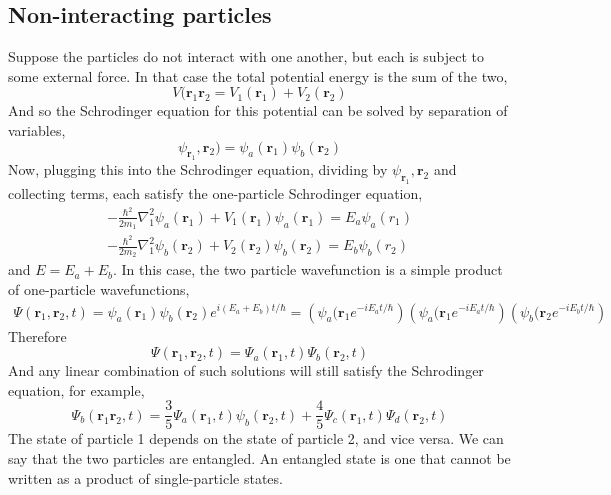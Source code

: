 \subsection{Non-interacting particles}
Suppose the particles do not interact with one another, but each is subject to some external force. In that case the total potential energy is the sum of the two,
\begin{equation}
    V(\textbf{r}_1\textbf{r}_2=V_1(\textbf{r}_1)+V_2(\textbf{r}_2)
\end{equation}
And so the Schrodinger equation for this potential can be solved by separation of variables,
\begin{equation}
    \psi_\textbf{r}_1,\textbf{r}_2)=\psi_a(\textbf{r}_1)\psi_b(\textbf{r}_2)
\end{equation}
Now, plugging this into the Schrodinger equation, dividing by $\psi_\textbf{r}_1,\textbf{r}_2$ and collecting terms, each satisfy the one-particle Schrodinger equation,
\begin{gather}
    -\frac{\hbar^2}{2m_1}\nabla^2_1\psi_a(\textbf{r}_1)+V_1(\textbf{r}_1)\psi_a(\textbf{r}_1)=E_a\psi_a(r_1)\\
     -\frac{\hbar^2}{2m_2}\nabla^2_1\psi_b(\textbf{r}_2)+V_2(\textbf{r}_2)\psi_b(\textbf{r}_2)=E_b\psi_b(r_2)
\end{gather}
and $E=E_a+E_b$. In this case, the two particle wavefunction is a simple product of one-particle wavefunctions,
\begin{gather}
    \Psi(\textbf{r}_1,\textbf{r}_2,t)=\psi_a(\textbf{r}_1)\psi_b(\textbf{r}_2)e^{i(E_a+E_b)t/\hbar}=\left(\psi_a(\textbf{r}_1e^{-iE_at/\hbar}\right)\left(\psi_a(\textbf{r}_1e^{-iE_at/\hbar}\right)\left(\psi_b(\textbf{r}_2e^{-iE_bt/\hbar}\right)
\end{gather}
Therefore
\begin{equation}
    \Psi(\textbf{r}_1,\textbf{r}_2,t)=\Psi_a(\textbf{r}_1,t)\Psi_b(\textbf{r}_2,t)
\end{equation}
And any linear combination of such solutions will still satisfy the Schrodinger equation, for example,
\begin{equation}
    \Psi_b(\textbf{r}_1\textbf{r}_2,t)=\frac{3}{5}\Psi_a(\textbf{r}_1,t)\psi_b(\textbf{r}_2,t)+\frac{4}{5}\Psi_c(\textbf{r}_1,t)\Psi_d(\textbf{r}_2,t)
\end{equation}
The state of particle 1 depends on the state of particle 2, and vice versa. We can say that the two particles are entangled. An entangled state is one that cannot be written as a product of single-particle states.

